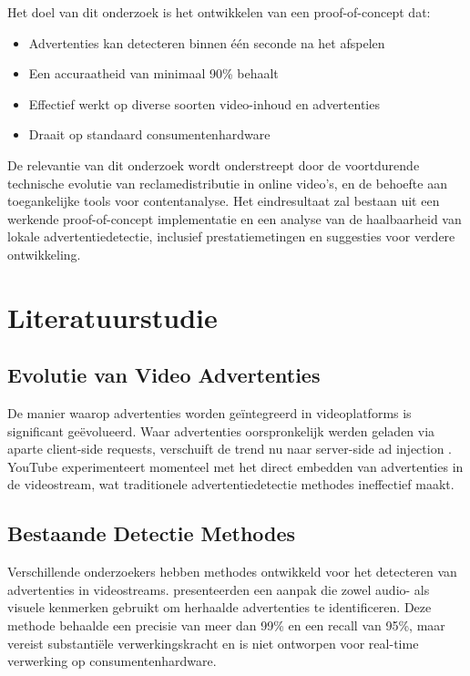 Het doel van dit onderzoek is het ontwikkelen van een proof-of-concept dat:
\begin{itemize}
   \item Advertenties kan detecteren binnen één seconde na het afspelen
   \item Een accuraatheid van minimaal 90\% behaalt
   \item Effectief werkt op diverse soorten video-inhoud en advertenties
   \item Draait op standaard consumentenhardware
\end{itemize}

De relevantie van dit onderzoek wordt onderstreept door de voortdurende technische evolutie van reclamedistributie in online video's, en de behoefte aan toegankelijke tools voor contentanalyse. Het eindresultaat zal bestaan uit een werkende proof-of-concept implementatie en een analyse van de haalbaarheid van lokale advertentiedetectie, inclusief prestatiemetingen en suggesties voor verdere ontwikkeling.


\section{Literatuurstudie}%
\label{sec:literatuurstudie}

\subsection{Evolutie van Video Advertenties}
De manier waarop advertenties worden geïntegreerd in videoplatforms is significant geëvolueerd. Waar advertenties oorspronkelijk werden geladen via aparte client-side requests, verschuift de trend nu naar server-side ad injection \autocite{Li2024}. YouTube experimenteert momenteel met het direct embedden van advertenties in de videostream, wat traditionele advertentiedetectie methodes ineffectief maakt.

\subsection{Bestaande Detectie Methodes}
Verschillende onderzoekers hebben methodes ontwikkeld voor het detecteren van advertenties in videostreams. \textcite{Covell2007} presenteerden een aanpak die zowel audio- als visuele kenmerken gebruikt om herhaalde advertenties te identificeren. Deze methode behaalde een precisie van meer dan 99\% en een recall van 95\%, maar vereist substantiële verwerkingskracht en is niet ontworpen voor real-time verwerking op consumentenhardware.

